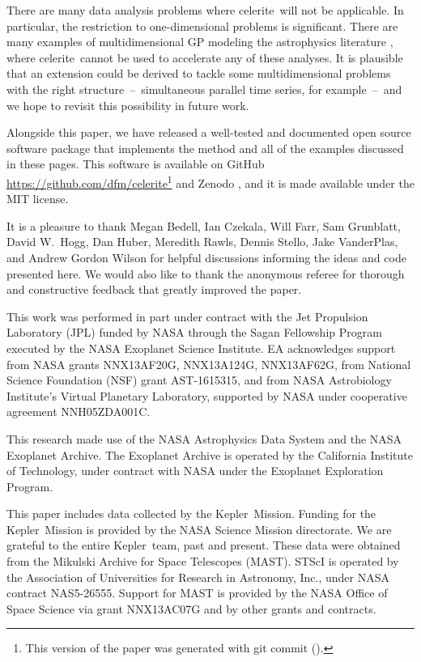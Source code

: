 \documentclass[manuscript, letterpaper]{aastex6}
\newcommand{\project}[1]{\textsf{#1}}
\newcommand{\kepler}{\project{Kepler}}
\newcommand{\celerite}{\project{celerite}}
\newcommand{\response}[1]{{\color{blue}#1}}
\begin{document}
There are many data analysis problems where \celerite\ will not be applicable.
In particular, the restriction to one-dimensional problems is significant.
There are many examples of multidimensional GP modeling the astrophysics
literature \citep[recent examples from the field of exoplanet characterization
include][]{Haywood:2014, Rajpaul:2015, Aigrain:2016}, where \celerite\ cannot
be used to accelerate any of these analyses.
It is plausible that an extension could be derived to tackle some
multidimensional problems with the right structure~--~simultaneous parallel
time series, for example~--~and we hope to revisit this possibility in future
work.

Alongside this paper, we have released a well-tested and documented open
source software package that implements the method and all of the examples
discussed in these pages.
This software is available on GitHub
\url{https://github.com/dfm/celerite}\footnote{This version of the paper was
generated with git commit \texttt{\githash} (\gitdate).} and Zenodo
\citep{Foreman-Mackey:2017}, and it is made available under the MIT license.

\acknowledgments
It is a pleasure to thank
Megan Bedell,
Ian Czekala,
Will Farr,
Sam Grunblatt,
David W.\ Hogg,
Dan Huber,
Meredith Rawls,
Dennis Stello,
Jake VanderPlas, and
Andrew Gordon Wilson
for helpful discussions informing the ideas and code presented here.
\response{We would also like to thank the anonymous referee for thorough and
constructive feedback that greatly improved the paper.}

This work was performed in part under contract with the Jet Propulsion
Laboratory (JPL) funded by NASA through the Sagan Fellowship Program executed
by the NASA Exoplanet Science Institute.
EA acknowledges support from NASA grants NNX13AF20G, NNX13A124G, NNX13AF62G,
from National Science Foundation (NSF) grant AST-1615315, and from
NASA Astrobiology Institute's Virtual Planetary Laboratory, supported
by NASA under cooperative agreement NNH05ZDA001C.

This research made use of the NASA \project{Astrophysics Data System} and the
NASA Exoplanet Archive.
The Exoplanet Archive is operated by the California Institute of Technology,
under contract with NASA under the Exoplanet Exploration Program.

This paper includes data collected by the \kepler\ Mission. Funding for the
\kepler\ Mission is provided by the NASA Science Mission directorate.
We are grateful to the entire \kepler\ team, past and present.
These data were obtained from the Mikulski Archive for Space Telescopes
(MAST).
STScI is operated by the Association of Universities for Research in
Astronomy, Inc., under NASA contract NAS5-26555.
Support for MAST is provided by the NASA Office of Space Science via grant
NNX13AC07G and by other grants and contracts.
\end{document}

